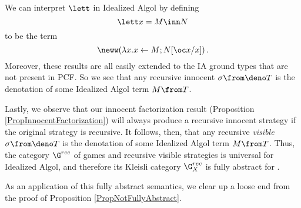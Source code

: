 We can interpret $\lett$ in Idealized Algol by defining
\[
  \lett x = M \inn N
  \]
to be the term
\[
  \neww (\lambda x. x\gets M;N[\oc x/x])\,.
  \]
Moreover, these results are all easily extended to the IA ground types that are not present in PCF.  
So we see that any recursive innocent $\sigma\from \deno T$ is the denotation of some Idealized Algol term $M \from T$.

Lastly, we observe that our innocent factorization result (Proposition \ref{PropInnocentFactorization}) will always produce a recursive innocent strategy if the original strategy is recursive.  
It follows, then, that any recursive \emph{visible} $\sigma\from \deno T$ is the denotation of some Idealized Algol term $M \from T$.
Thus, the category $\G^{rec}$ of games and recursive visible strategies is universal for Idealized Algol, and therefore its Kleisli category $\G^{rec}_X$ is fully abstract for \IAX.

As an application of this fully abstract semantics, we clear up a loose end from the proof of Proposition \ref{PropNotFullyAbstract}.

